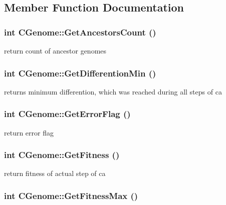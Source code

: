\subsection{Member Function Documentation}
\hypertarget{classCGenome_a2d0d112a35ca90fdb715bc8fdc87a683}{
\subsubsection[{GetAncestorsCount}]{\setlength{\rightskip}{0pt plus 5cm}int CGenome::GetAncestorsCount ()}}
\label{classCGenome_a2d0d112a35ca90fdb715bc8fdc87a683}
return count of ancestor genomes \hypertarget{classCGenome_a7d7ddf14f33e67482827aac0a6dfe10c}{
\subsubsection[{GetDifferentionMin}]{\setlength{\rightskip}{0pt plus 5cm}int CGenome::GetDifferentionMin ()}}
\label{classCGenome_a7d7ddf14f33e67482827aac0a6dfe10c}
returns minimum differention, which was reached during all steps of ca \hypertarget{classCGenome_a56f771356480c9c018e459187914ed8f}{
\subsubsection[{GetErrorFlag}]{\setlength{\rightskip}{0pt plus 5cm}int CGenome::GetErrorFlag ()}}
\label{classCGenome_a56f771356480c9c018e459187914ed8f}
return error flag \hypertarget{classCGenome_ab377704570de61d40c5c35cbc4038b8f}{
\subsubsection[{GetFitness}]{\setlength{\rightskip}{0pt plus 5cm}int CGenome::GetFitness ()}}
\label{classCGenome_ab377704570de61d40c5c35cbc4038b8f}
return fitness of actual step of ca \hypertarget{classCGenome_a5ca3b39ec73b06b0bd2c6c15e058c692}{
\subsubsection[{GetFitnessMax}]{\setlength{\rightskip}{0pt plus 5cm}int CGenome::GetFitnessMax ()}}
